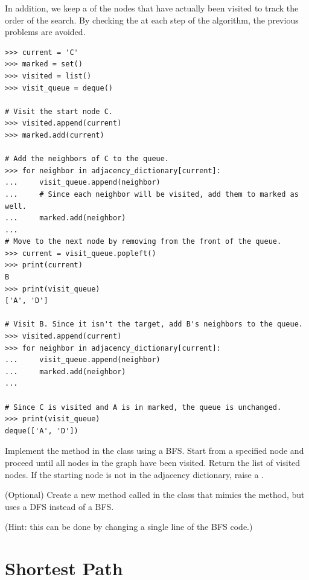 In addition, we keep a  of the nodes that have actually been visited to track the order of the search.
By checking the  at each step of the algorithm, the previous problems are avoided.

\begin{lstlisting}
>>> current = 'C'
>>> marked = set()
>>> visited = list()
>>> visit_queue = deque()

# Visit the start node C.
>>> visited.append(current)
>>> marked.add(current)

# Add the neighbors of C to the queue.
>>> for neighbor in adjacency_dictionary[current]:
...     visit_queue.append(neighbor)
...     # Since each neighbor will be visited, add them to marked as well.
...     marked.add(neighbor)
...
# Move to the next node by removing from the front of the queue.
>>> current = visit_queue.popleft()
>>> print(current)
B
>>> print(visit_queue)
['A', 'D']

# Visit B. Since it isn't the target, add B's neighbors to the queue.
>>> visited.append(current)
>>> for neighbor in adjacency_dictionary[current]:
...     visit_queue.append(neighbor)
...     marked.add(neighbor)
...

# Since C is visited and A is in marked, the queue is unchanged.
>>> print(visit_queue)
deque(['A', 'D'])
\end{lstlisting}

\begin{problem}
Implement the  method in the  class using a BFS.
Start from a specified node and proceed until all nodes in the graph have been visited.
Return the list of visited nodes.
If the starting node is not in the adjacency dictionary, raise a .
\end{problem}

\begin{problem}
(Optional) Create a new method called  in the  class
that mimics the  method, but uses a DFS instead of a BFS.

(Hint: this can be done by changing a single line of the BFS code.)
\end{problem}

\section*{Shortest Path}

